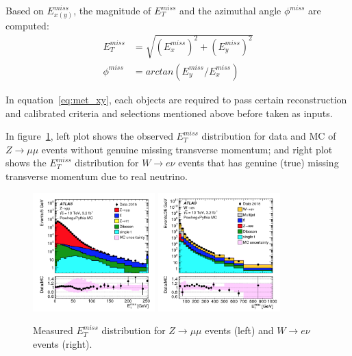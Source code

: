 Based on $E_{x(y)}^{miss}$, the magnitude of $E_{T}^{miss}$ and the azimuthal angle $\phi^{miss}$ are computed:
\begin{equation}
\begin{split}
	E_{T}^{miss} &= \sqrt{ \left(E_{x}^{miss}\right)^{2} + \left(E_{y}^{miss}\right)^{2} } \\
	\phi^{miss} &= arctan \left(E_{y}^{miss}/E_{x}^{miss}\right)
\end{split}
\end{equation}

In equation~\ref{eq:met_xy}, each objects are required to pass certain reconstruction and calibrated criteria and selections mentioned above before taken as inputs.

In figure~\ref{fig:met_dis}, left plot shows the observed $E_{T}^{miss}$ distribution for data and MC of $Z \rightarrow \mu\mu$ events without genuine missing transverse momentum;
and right plot shows the $E_{T}^{miss}$ distribution for $W \rightarrow e\nu$ events that has genuine (true) missing transverse momentum due to real neutrino.
\begin{figure}[!htb]
  \centering
  \includegraphics[width=0.42\textwidth]{figures/Simulation/met_Zmm.png}
  \includegraphics[width=0.42\textwidth]{figures/Simulation/met_Wev.png}
  \caption{Measured $E_{T}^{miss}$ distribution for $Z \rightarrow \mu\mu$ events (left) and $W \rightarrow e\nu$ events (right). }
  \label{fig:met_dis}
\end{figure}
